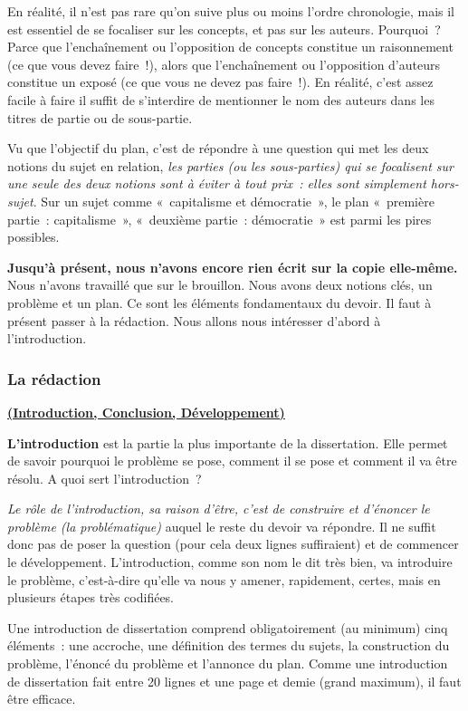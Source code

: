 \documentclass[
  letterpaper,
  DIV=11,
  numbers=noendperiod]{scrartcl}
\begin{document}
En réalité, il n'est pas rare qu'on suive plus ou moins l'ordre
chronologie, mais il est essentiel de se focaliser sur les concepts, et
pas sur les auteurs. Pourquoi~? Parce que l'enchaînement ou l'opposition
de concepts constitue un raisonnement (ce que vous devez faire~!), alors
que l'enchaînement ou l'opposition d'auteurs constitue un exposé (ce que
vous ne devez pas faire~!). En réalité, c'est assez facile à faire il
suffit de s'interdire de mentionner le nom des auteurs dans les titres
de partie ou de sous-partie.

Vu que l'objectif du plan, c'est de répondre à une question qui met les
deux notions du sujet en relation, \emph{les parties (ou les
sous-parties) qui se focalisent sur une seule des deux notions sont à
éviter à tout prix~: elles sont simplement hors-sujet}. Sur un sujet
comme «~capitalisme et démocratie~», le plan «~première partie~:
capitalisme~», «~deuxième partie~: démocratie~» est parmi les pires
possibles.

\textbf{Jusqu'à présent, nous n'avons encore rien écrit sur la copie
elle-même.} Nous n'avons travaillé que sur le brouillon. Nous avons deux
notions clés, un problème et un plan. Ce sont les éléments fondamentaux
du devoir. Il faut à présent passer à la rédaction. Nous allons nous
intéresser d'abord à l'introduction.

\subsubsection{La rédaction}\label{la-ruxe9daction}

\ul{\textbf{(Introduction, Conclusion, Développement)}}

\textbf{L'introduction} est la partie la plus importante de la
dissertation. Elle permet de savoir pourquoi le problème se pose,
comment il se pose et comment il va être résolu. A quoi sert
l'introduction~?

\emph{Le rôle de l'introduction, sa raison d'être, c'est de construire
et d'énoncer le problème (la problématique)} auquel le reste du devoir
va répondre. Il ne suffit donc pas de poser la question (pour cela deux
lignes suffiraient) et de commencer le développement. L'introduction,
comme son nom le dit très bien, va introduire le problème, c'est-à-dire
qu'elle va nous y amener, rapidement, certes, mais en plusieurs étapes
très codifiées.

Une introduction de dissertation comprend obligatoirement (au minimum)
cinq éléments~: une accroche, une définition des termes du sujets, la
construction du problème, l'énoncé du problème et l'annonce du plan.
Comme une introduction de dissertation fait entre 20 lignes et une page
et demie (grand maximum), il faut être efficace.
\end{document}
